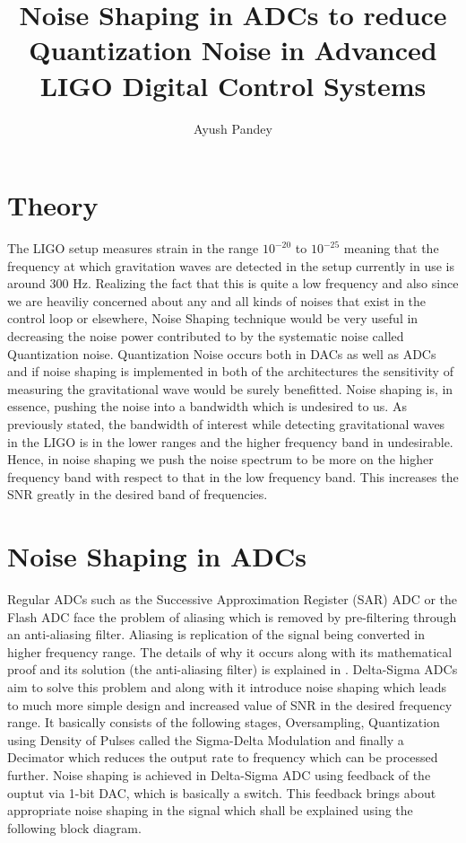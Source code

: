\documentclass[colorlinks=true,pdfstartview=FitV,linkcolor=blue,
            citecolor=red,urlcolor=magenta]{ligodoc}
\title{Noise Shaping in ADCs to reduce Quantization Noise in Advanced LIGO Digital Control Systems}
\author{Ayush Pandey}
\begin{document}
\section{Theory}
 The LIGO setup measures strain in the range $10^{-20}$ to $10^{-25}$ meaning that the frequency at which gravitation waves are detected in the setup currently in use is around 300 Hz. Realizing the fact that this is quite a low frequency and also since we are heaviliy concerned about any and all kinds of noises that exist in the control loop or elsewhere, Noise Shaping technique would be very useful in decreasing the noise power contributed to by the systematic noise called Quantization noise. Quantization Noise occurs both in DACs as well as ADCs and if noise shaping is implemented in both of the architectures the sensitivity of measuring the gravitational wave would be surely benefitted. 
 Noise shaping is, in essence, pushing the noise into a bandwidth which is undesired to us. As previously stated, the bandwidth of interest while detecting gravitational waves in the LIGO is in the lower ranges and the higher frequency band in undesirable. Hence, in noise shaping we push the noise spectrum to be more on the higher frequency band with respect to that in the low frequency band. This increases the SNR greatly in the desired band of frequencies. 
 
 \section{Noise Shaping in ADCs}
 Regular ADCs such as the Successive Approximation Register (SAR) ADC or the Flash ADC face the problem of aliasing which is removed by pre-filtering through an anti-aliasing filter. Aliasing is replication of the signal being converted in higher frequency range. The details of why it occurs along with its mathematical proof and its solution (the anti-aliasing filter) is explained in \cite{Oppenheim}. 
 Delta-Sigma ADCs aim to solve this problem and along with it introduce noise shaping which leads to much more simple design and increased value of SNR in the desired frequency range. It basically consists of the following stages, Oversampling, Quantization using Density of Pulses called the Sigma-Delta Modulation and finally a Decimator which reduces the output rate to frequency which can be processed further. 
 Noise shaping is achieved in Delta-Sigma ADC using feedback of the ouptut via 1-bit DAC, which is basically a switch. This feedback brings about appropriate noise shaping in the signal which shall be explained using the following block diagram.
 
\end{document}

